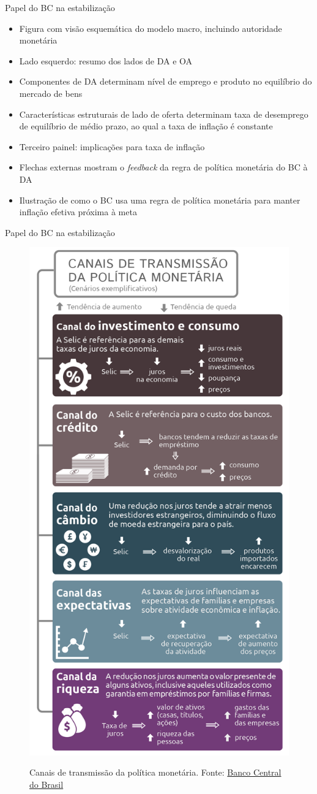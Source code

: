 \documentclass[10pt]{beamer}
\begin{document}
\begin{frame}
    {Papel do BC na estabilização}
    \begin{itemize}
        \item Figura com visão esquemática do modelo macro, incluindo autoridade monetária\bigskip
        \item Lado esquerdo: resumo dos lados de DA e OA\bigskip
        \item Componentes de DA determinam nível de emprego e produto no equilíbrio do mercado de bens\bigskip
        \item Características estruturais de lado de oferta determinam taxa de desemprego de equilíbrio de médio prazo, ao qual a taxa de inflação é constante\bigskip
        \item Terceiro painel: implicações para taxa de inflação\bigskip
        \item Flechas externas mostram o \emph{feedback} da regra de política monetária do BC à DA\bigskip
        \item Ilustração de como o BC usa uma regra de política monetária para manter inflação efetiva próxima à meta
    \end{itemize}
\end{frame}

\begin{frame}
    {Papel do BC na estabilização}
    \begin{figure}
        \href{https://www.bcb.gov.br/content/controleinflacao/Infograficos_controleinflacao/VF_ajuste_info_canais_de_transmissao_da_politica_monetaria_br_0509_2021.png}{\includegraphics[width=.23\textwidth]{./figures/aula15_fig4.png}}
        \caption{Canais de transmissão da política monetária. Fonte: \href{https://www.bcb.gov.br/content/controleinflacao/Infograficos_controleinflacao/VF_ajuste_info_canais_de_transmissao_da_politica_monetaria_br_0509_2021.png}{Banco Central do Brasil}}
    \end{figure}
\end{frame}
\end{document}
